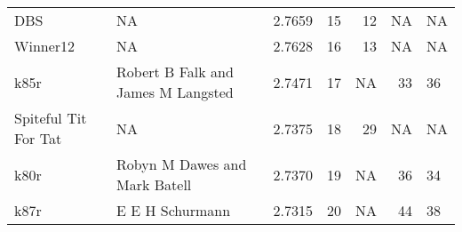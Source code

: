 \begin{tabular}{llrrrrl}
DBS                        &                                  NA &  2.7659 &    15 &            12 &             NA &              NA \\
Winner12                   &                                  NA &  2.7628 &    16 &            13 &             NA &              NA \\
k85r                       &  Robert B Falk and James M Langsted &  2.7471 &    17 &            NA &             33 &              36 \\
Spiteful Tit For Tat       &                                  NA &  2.7375 &    18 &            29 &             NA &              NA \\
k80r                       &       Robyn M Dawes and Mark Batell &  2.7370 &    19 &            NA &             36 &              34 \\
k87r                       &                     E E H Schurmann &  2.7315 &    20 &            NA &             44 &              38 \\
\bottomrule
\end{tabular}
